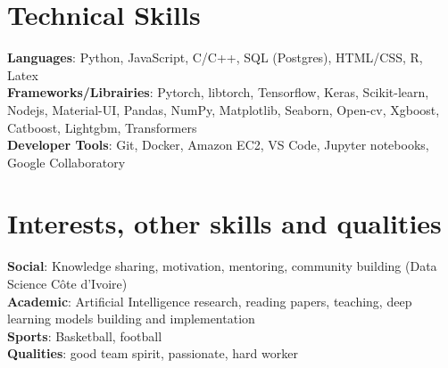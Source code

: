 \documentclass[letterpaper,11pt]{article}
\begin{document}
\section{\textbf{Technical Skills}}
 \begin{itemize}[leftmargin=0.15in, label={}]
    \small{\item{
        \textbf{Languages}{: Python, JavaScript, C/C++, SQL (Postgres), HTML/CSS, R, Latex} \\
        \textbf{Frameworks/Librairies}{: Pytorch, libtorch, Tensorflow, Keras, Scikit-learn, Nodejs, Material-UI, Pandas, NumPy, Matplotlib, Seaborn, Open-cv, Xgboost, Catboost, Lightgbm, Transformers} \\
        \textbf{Developer Tools}{: Git, Docker, Amazon EC2, VS Code, Jupyter notebooks, Google Collaboratory} \\
    }}
 \end{itemize}

%
\section{\textbf{Interests, other skills and qualities}}
\begin{itemize}[leftmargin=0.15in, label={}]
    \small{\item{
        \textbf{Social}{: Knowledge sharing, motivation, mentoring, community building (Data Science Côte d'Ivoire)} \\
        \textbf{Academic}{: Artificial Intelligence research, reading papers, teaching, deep learning models building and implementation} \\
        \textbf{Sports}{: Basketball, football} \\
        \textbf{Qualities}{: good team spirit, passionate, hard worker} \\

    }}
 \end{itemize}


\end{document}
